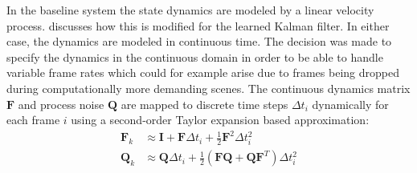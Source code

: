 In the baseline system the state dynamics are modeled by a linear velocity process.  discusses how this is modified for the learned Kalman filter. In either case, the dynamics are modeled in continuous time. The decision was made to specify the dynamics in the continuous domain in order to be able to handle variable frame rates which could for example arise due to frames being dropped during computationally more demanding scenes. The continuous dynamics matrix $\mathbf{F}$ and process noise $\mathbf{Q}$ are mapped to discrete time steps $\Delta t_i$ dynamically for each frame $i$ using a second-order Taylor expansion based approximation:
\begin{align*}
    \mathbf{F}_k &\approx \mathbf{I} + \mathbf{F} \Delta t_i + \frac{1}{2} \mathbf{F}^2 \Delta t_i^2 \\
    \mathbf{Q}_k &\approx \mathbf{Q} \Delta t_i + \frac{1}{2} (\mathbf{F} \mathbf{Q} + \mathbf{Q} \mathbf{F}^T) \Delta t_i^2
\end{align*}

